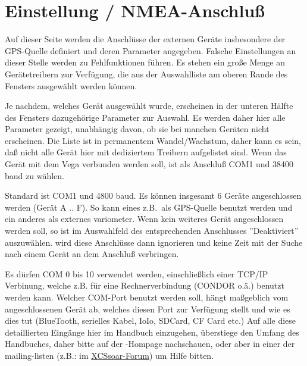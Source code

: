 \section{Einstellung / NMEA-Anschluß} \label{conf:comdevices}

Auf dieser Seite werden die Anschlüsse der externen Geräte insbesondere der GPS-Quelle definiert und deren Parameter
angegeben. Falsche Einstellungen an dieser Stelle werden zu Fehlfunktionen führen. Es stehen ein große Menge an Gerätetreibern zur Verfügung, die aus der Auswahlliste am
oberen Rande des Fensters ausgewählt werden können.

Je nachdem, welches Gerät ausgewählt wurde, erscheinen in der unteren Hälfte des Fensters dazugehörige
Parameter zur Auswahl. \achtung Es werden daher hier alle Parameter gezeigt, unabhängig davon, ob sie bei manchen Geräten nicht erscheinen.
Die Liste ist in permanentem Wandel/Wachstum, daher kann es sein, daß nicht alle Gerät hier mit dediziertem Treibern aufgelistet sind.
Wenn das Gerät mit dem Vega verbunden werden soll, ist als Anschluß COM1 und 38400 baud zu wählen.

Standard ist COM1 und 4800 baud. Es können insgesamt 6 Geräte angeschlossen werden (Gerät A .. F).
So kann eines z.B.\ als GPS-Quelle benutzt werden und ein anderes als externes variometer.
Wenn kein weiteres Gerät angeschlossen werden soll, so ist im Auswahlfeld des entsprechenden Anschlusses ''Deaktiviert'' auszuwählen.
\xc wird diese Anschlüsse dann ignorieren und keine Zeit mit der Suche nach einem Gerät an dem Anschluß verbringen.

Es dürfen COM 0 bis 10 verwendet werden,  einschließlich einer TCP/IP Verbinung, welche z.B. für eine
Rechnerverbindung (\textsc{CONDOR} o.ä.) benutzt werden kann. Welcher COM-Port benutzt werden soll, hängt maßgeblich vom angeschlossenen Gerät ab,
welches diesen Port zur Verfügung stellt und wie es dies tut (BlueTooth, serielles Kabel, IoIo, SDCard, CF Card etc.) Auf alle diese detaillierten
Eingänge hier im Handbuch einzugehen, überstiege den Umfang des Handbuches, daher bitte auf der \xc-Hompage nachschauen, oder aber
in einer der mailing-listen  (z.B.:  im \href{http://forum.xcsoar.org/}{XCSsoar-Forum}) um Hilfe bitten.

